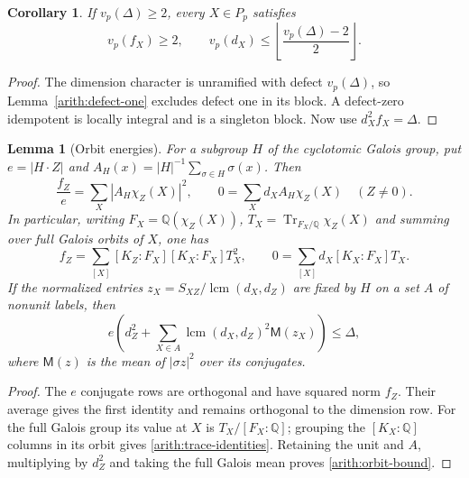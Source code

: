 \documentclass[11pt,a4paper]{article}
\numberwithin{equation}{section}
\newtheorem{lemma}[theorem]{Lemma}
\newtheorem{corollary}[theorem]{Corollary}
\begin{document}
\begin{corollary}\label{arith:principal-height}
If $v_p(\Delta)\ge2$, every $X\in P_p$ satisfies
\[
 v_p(f_X)\ge2,\qquad
 v_p(d_X)\le\left\lfloor\frac{v_p(\Delta)-2}{2}\right\rfloor.
\]
\end{corollary}
\begin{proof}
The dimension character is unramified with defect $v_p(\Delta)$,
so Lemma~\ref{arith:defect-one} excludes defect one in its block.
A defect-zero idempotent is locally integral and is a singleton
block. Now use $d_X^2f_X=\Delta$.
\end{proof}

\begin{lemma}[Orbit energies]\label{arith:trace-energy}
For a subgroup $H$ of the cyclotomic Galois group, put
$e=|H\cdot Z|$ and $A_H(x)=|H|^{-1}\sum_{\sigma\in H}\sigma(x)$.
Then
\[
 \frac{f_Z}{e}=\sum_X|A_H\chi_Z(X)|^2,
 \qquad 0=\sum_Xd_XA_H\chi_Z(X)\quad(Z\ne0).
\]
In particular, writing $F_X=\mathbb Q(\chi_Z(X))$,
$T_X=\operatorname{Tr}_{F_X/\mathbb Q}\chi_Z(X)$ and summing over
full Galois orbits of $X$, one has
\begin{equation}\label{arith:trace-identities}
 f_Z=\sum_{[X]}[K_Z:F_X][K_X:F_X]T_X^2,
 \qquad 0=\sum_{[X]}d_X[K_X:F_X]T_X.
\end{equation}
If the normalized entries $z_X=S_{XZ}/\operatorname{lcm}(d_X,d_Z)$
are fixed by $H$ on a set $A$ of nonunit labels, then
\begin{equation}\label{arith:orbit-bound}
 e\left(d_Z^2+\sum_{X\in A}\operatorname{lcm}(d_X,d_Z)^2
                         \mathsf M(z_X)\right)\le\Delta,
\end{equation}
where $\mathsf M(z)$ is the mean of $|\sigma z|^2$ over its conjugates.
\end{lemma}
\begin{proof}
The $e$ conjugate rows are orthogonal and have squared norm $f_Z$.
Their average gives the first identity and remains orthogonal to
the dimension row. For the full Galois group its value at $X$ is
$T_X/[F_X:\mathbb Q]$; grouping the $[K_X:\mathbb Q]$ columns
in its orbit gives \eqref{arith:trace-identities}. Retaining the
unit and $A$, multiplying by $d_Z^2$ and taking the full Galois
mean proves \eqref{arith:orbit-bound}.
\end{proof}
\end{document}

